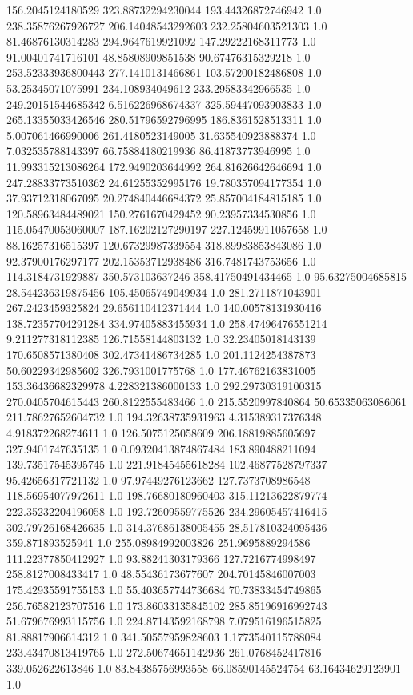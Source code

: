 156.2045124180529	323.88732294230044	193.44326872746942	1.0
238.35876267926727	206.14048543292603	232.25804603521303	1.0
81.46876130314283	294.9647619921092	147.29222168311773	1.0
91.00401741716101	48.85808909851538	90.67476315329218	1.0
253.52333936800443	277.1410131466861	103.57200182486808	1.0
53.25345071075991	234.108934049612	233.29583342966535	1.0
249.20151544685342	6.516226968674337	325.59447093903833	1.0
265.13355033426546	280.51796592796995	186.8361528513311	1.0
5.007061466990006	261.4180523149005	31.635540923888374	1.0
7.032535788143397	66.75884180219936	86.41873773946995	1.0
11.993315213086264	172.9490203644992	264.81626642646694	1.0
247.28833773510362	24.61255352995176	19.780357094177354	1.0
37.93712318067095	20.274840446684372	25.857004184815185	1.0
120.58963484489021	150.2761670429452	90.23957334530856	1.0
115.05470053060007	187.16202127290197	227.12459911057658	1.0
88.16257316515397	120.67329987339554	318.89983853843086	1.0
92.37900176297177	202.15353712938486	316.7481743753656	1.0
114.3184731929887	350.573103637246	358.41750491434465	1.0
95.63275004685815	28.544236319875456	105.45065749049934	1.0
281.2711871043901	267.2423459325824	29.656110412371444	1.0
140.00578131930416	138.72357704291284	334.97405883455934	1.0
258.47496476551214	9.211277318112385	126.71558144803132	1.0
32.23405018143139	170.6508571380408	302.47341486734285	1.0
201.1124254387873	50.60229342985602	326.7931001775768	1.0
177.46762163831005	153.36436682329978	4.228321386000133	1.0
292.29730319100315	270.0405704615443	260.8122555483466	1.0
215.5520997840864	50.65335063086061	211.78627652604732	1.0
194.32638735931963	4.315389317376348	4.918372268274611	1.0
126.5075125058609	206.18819885605697	327.9401747635135	1.0
0.09320413874867484	183.890488211094	139.73517545395745	1.0
221.91845455618284	102.46877528797337	95.42656317721132	1.0
97.97449276123662	127.7373708986548	118.56954077972611	1.0
198.76680180960403	315.11213622879774	222.35232204196058	1.0
192.72609559775526	234.29605457416415	302.79726168426635	1.0
314.37686138005455	28.517810324095436	359.871893525941	1.0
255.08984992003826	251.9695889294586	111.22377850412927	1.0
93.88241303179366	127.7216774998497	258.8127008433417	1.0
48.55436173677607	204.70145846007003	175.42935591755153	1.0
55.403657744736684	70.73833454749865	256.76582123707516	1.0
173.86033135845102	285.85196916992743	51.679676993115756	1.0
224.87143592168798	7.079516196515825	81.88817906614312	1.0
341.50557959828603	1.1773540115788084	233.43470813419765	1.0
272.50674651142936	261.0768452417816	339.052622613846	1.0
83.84385756993558	66.08590145524754	63.16434629123901	1.0
